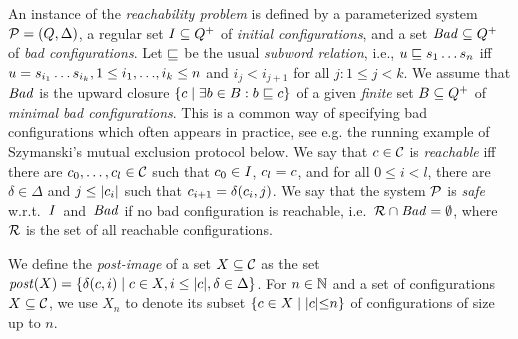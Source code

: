 An instance of the \emph{reachability problem} is defined by a
parameterized system ${\mathcal P} = (Q,\Delta)$, a regular set
$\mathit{I}\subseteq Q^+$ of \emph{initial configurations}, and a set
$\mathit{Bad}\subseteq Q^+$ of \emph{bad configurations}. 
%
Let $\sqsubseteq$ be the usual \emph{subword relation}, i.e.,
$u\sqsubseteq s_1\ldots s_n$ iff $u=s_{i_1}\ldots s_{i_k},1\leq
i_1,{\ldots},i_k\leq n$ and $i_j<i_{j+1}$ for all $j:1\leq j < k$.
%
We assume that $\mathit{Bad}$ is the upward closure $\{c\mid\exists b
\in B:b\sqsubseteq c\}$ of a given \emph{finite} set
$B\subseteq Q^+$ of \emph{minimal bad configurations}. 
%
This is a common way of specifying bad configurations which often
appears in practice, see e.g. the running example of Szymanski's
mutual exclusion protocol below.
%
We say that $c\in \mathcal C$ is \emph{reachable} iff there are
$c_0,\ldots, c_l\in\mathcal C$ such that $c_0\in \mathit{I}$,
$c_l = c$, and for all $0\leq
i < l$, there are $\delta\in\Delta$ and $j\leq |c_i|$ such that $c_{i+1} = \delta(c_{i},j)$. 
%
%
We say that the system ${\mathcal P}$ is \emph{safe} w.r.t.\
$\mathit{I}$~and~$\mathit{Bad}$ if no bad configuration is reachable, i.e.\
$\mathcal{R}\cap\mathit{Bad} = \emptyset$, where $\mathcal{R}$ is the set of all
reachable configurations.


We define the \emph{post-image} of a set $X\subseteq\mathcal C$
 as the set ${\mathit{post}}(X) = \{\delta(c,i)\mid c\in X,i\leq|c|,\delta\in\Delta\}$.
%
For $n\in\mathbb N$ and a set of configurations $X \subseteq \mathcal C$, we
use $X_n$ to denote its subset $\{{c\in X}\mathrel{}\mid\mathrel{}{|c|{\leq}n}\}$ of
configurations of size up to $n$.
%
%
%

